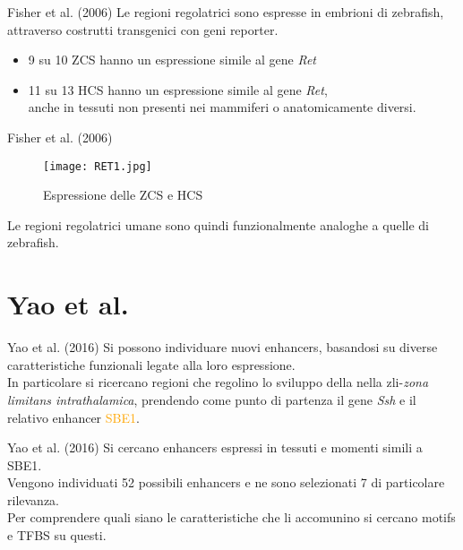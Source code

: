 \documentclass{beamer}
\begin{document}
    \begin{frame}[plain]{Fisher et al. (2006)}
        Le regioni regolatrici sono espresse in embrioni di zebrafish,
        attraverso costrutti transgenici con geni reporter.
        \begin{itemize}
            \item 9 su 10 ZCS hanno un espressione simile al gene \emph{Ret}
            \item 11 su 13 HCS hanno un espressione simile al gene \emph{Ret},\\
            anche in tessuti non presenti nei mammiferi o anatomicamente diversi.
        \end{itemize}
    \end{frame}


    \begin{frame}[plain]{Fisher et al. (2006)}
        \begin{figure}
            \texttt{[image: RET1.jpg]}
            \caption{Espressione delle ZCS e HCS}
        \end{figure}
        Le regioni regolatrici umane sono quindi funzionalmente analoghe a quelle di zebrafish.
    \end{frame}

    \section{Yao et al.}

    \begin{frame}[plain]{Yao et al. (2016)}
        Si possono individuare nuovi enhancers, basandosi su diverse caratteristiche funzionali
        legate alla loro espressione.\\
        In particolare si ricercano regioni che regolino lo sviluppo
        della nella zli-\emph{zona limitans intrathalamica},
        prendendo come punto di partenza il gene \emph{Ssh} e il relativo enhancer \textcolor{orange}{SBE1}.
    \end{frame}


    \begin{frame}[plain]{Yao et al. (2016)}
        Si cercano enhancers espressi in tessuti e momenti simili a SBE1.\\
        Vengono individuati 52 possibili enhancers e ne sono selezionati 7 di particolare rilevanza.\\
        Per comprendere quali siano le caratteristiche che li accomunino si
        cercano motifs e TFBS su questi.\\
    \end{frame}
\end{document}
